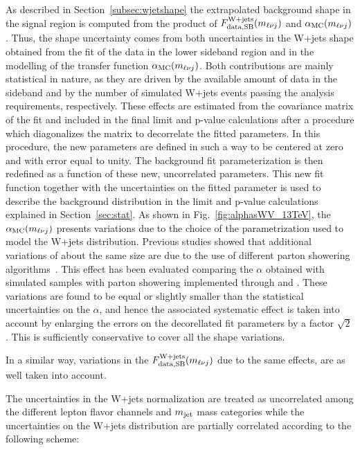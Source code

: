 As described in Section~\ref{subsec:wjetshape} the extrapolated background shape in the signal region is computed from the product of $F_\mathrm{data, SB}^{\mathrm{W+jets}}(m_{\ell\nu j})$ and $\alpha_\mathrm{MC}(m_{\ell\nu j})$.
Thus, the shape uncertainty comes from both uncertainties in the W+jets \mlvj shape obtained from the fit of the data in the lower \mJ sideband region and in the modelling of the transfer function $\alpha_\mathrm{MC}(m_{\ell\nu j})$.
Both contributions are mainly statistical in nature, as they are driven by the available amount of data in the sideband and by the number of simulated W+jets events passing the analysis requirements, respectively.
These effects are estimated from the covariance matrix of the fit and included in the final limit and p-value calculations after a procedure which diagonalizes the matrix to decorrelate the fitted parameters.
In this procedure, the new parameters are defined in such a way to be centered at zero and with error equal to unity. The background fit parameterization is then redefined as a function of these new, uncorrelated parameters.
This new fit function together with the uncertainties on the fitted parameter is used to describe the background distribution in the limit and p-value calculations explained in Section~\ref{sec:stat}.
As shown in Fig.~\ref{fig:alphasWV_13TeV}, the $\alpha_\mathrm{MC}(m_{\ell\nu j})$ presents variations due to the choice of the parametrization used to model the W+jets \mlvj distribution.
Previous studies showed that additional variations of about the same size are due to the use of different parton showering algorithms~\cite{Khachatryan:2014gha}. This effect has been evaluated comparing the $\alpha$ obtained with simulated samples with parton showering implemented through \HERWIG{++} and \PYTHIA{}. These variations are found to be equal or slightly smaller than the statistical uncertainties on the $\alpha$, and hence the associated systematic effect is taken into account by enlarging the errors on the decorellated fit parameters by a factor $\sqrt{2}$. This is sufficiently conservative to cover all the shape variations.

In a similar way, variations in the $F_\mathrm{data, SB}^{\mathrm{W+jets}}(m_{\ell\nu j})$ due to the same effects, are as well taken into account.

The uncertainties in the W+jets normalization are treated as uncorrelated among the different lepton flavor channels and $m_{\text{jet}}$ mass categories while the uncertainties on the W+jets \mlvj distribution are partially correlated
according to the following scheme:


